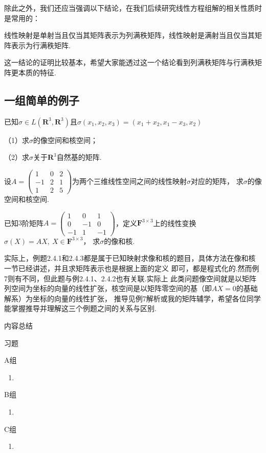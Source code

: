 除此之外，我们还应当强调以下结论，在我们后续研究线性方程组解的相关性质时是常用的：
\begin{theorem}
	线性映射是单射当且仅当其矩阵表示为列满秩矩阵，线性映射是满射当且仅当其矩阵表示为行满秩矩阵.
\end{theorem}
这一结论的证明比较基本，希望大家能透过这一个结论看到列满秩矩阵与行满秩矩阵更本质的特征.
\subsection{一组简单的例子}
\begin{example}
	已知$\sigma \in L(\mathbf{R}^3,\mathbf{R}^3)$且$\sigma(x_1,x_2,x_3)=(x_1+x_2,x_1-x_3, x_2)$
	
	\textup{（1）}求$\sigma$的像空间和核空间；

	\textup{（2）}求$\sigma$关于$\mathbf{R}^3$自然基的矩阵.
\end{example}

\begin{example}
	设$A=\begin{pmatrix}1 & 0 & 2 \\ -1 & 2 & 1 \\ 1 & 2 & 5\end{pmatrix}$为两个三维线性空间之间的线性映射$\sigma$对应的矩阵，
	求$\sigma$的像空间和核空间.
\end{example}

\begin{example}
	已知$3$阶矩阵$A=\begin{pmatrix}
		1 & 0 & 1 \\ 0 & -1 & 0 \\ -1 & 1 & -1
	\end{pmatrix}$，定义$\mathbf{F}^{3 \times 3}$上的线性变换$\sigma(X)=AX,\ X \in \mathbf{F}^{3 \times 3}$，
	求$\sigma$的像和核.
\end{example}
实际上，例题2.4.1和2.4.3都是属于已知映射求像和核的题目，具体方法在像和核一节已经讲述，并且求矩阵表示也是根据上面的定义
即可，都是程式化的.然而例7则有不同，但此题与例2.4.1、2.4.2也有关联.实际上
此类问题像空间就是以矩阵列空间为坐标的向量的线性扩张，核空间是以矩阵零空间的基（即$AX=0$的基础解系）为坐标的向量的线性扩张，
推导见例7解析或我的矩阵辅学，希望各位同学能掌握推导并理解这三个例题之间的关系与区别.

\vspace{2ex} 
\centerline{\heiti \Large 内容总结}

\vspace{2ex} 

\centerline{\heiti \Large 习题}
\vspace{2ex} 
{\kaishu }
\begin{flushright}
    \kaishu

\end{flushright}
\centerline{\heiti A组}
\begin{enumerate}
	\item 
\end{enumerate}
\centerline{\heiti B组}
\begin{enumerate}
	\item 
\end{enumerate}
\centerline{\heiti C组}
\begin{enumerate}
	\item 
\end{enumerate}